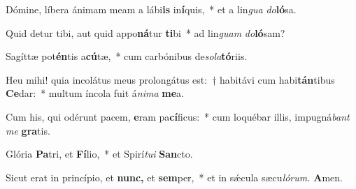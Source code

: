 \item Dómine, líbera ánimam meam a lábi\textbf{is} in\textbf{í}quis,~* et a lin\textit{gua} \textit{do}\textbf{ló}sa.
\item Quid detur tibi, aut quid appo\textbf{ná}tur \textbf{ti}bi~* ad lin\textit{guam} \textit{do}\textbf{ló}sam?
\item Sagíttæ pot\textbf{én}tis a\textbf{cú}tæ,~* cum carbónibus de\tinyhspace\textit{sola}\textbf{tó}riis.
\item Heu mihi! quia incolátus meus prolongátus est:~† habitávi cum habi\textbf{tán}tibus \textbf{Ce}dar:~* multum íncola fuit á\teenyhspace\textit{nima} \textbf{me}a.
\item Cum his, qui odérunt pacem, \textbf{e}ram pa\textbf{cí}ficus:~* cum loquébar illis, impugná\textit{bant} \textit{me} \textbf{gra}tis.
\item Glória \textbf{Pa}tri, et \textbf{Fí}lio,~* et Spirí\tinyhspace\textit{tui} \textbf{San}cto.
\item Sicut erat in princípio, et \textbf{nunc,} et \textbf{sem}per,~* et in sǽcula sæcu\tinyhspace\textit{lórum.} \textbf{A}men.
